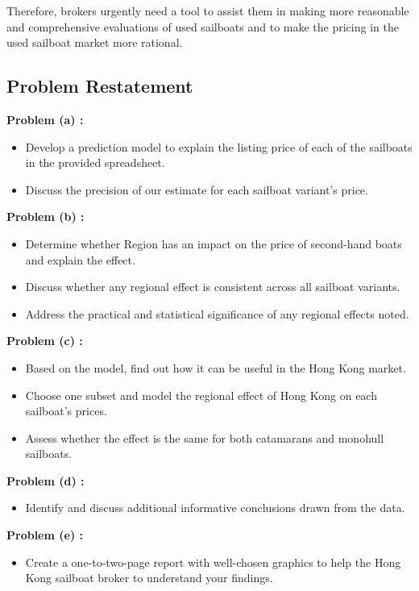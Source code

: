 \documentclass[12pt]{article}  %
\begin{document}
Therefore, brokers urgently need a tool to assist them in making more reasonable and comprehensive evaluations of used sailboats and to make the pricing in the used sailboat market more rational.
\subsection{Problem Restatement}
\textbf{Problem (a) :}
\begin{itemize}
    \item Develop a prediction model to explain the listing price of each of the sailboats in the provided spreadsheet.
    \item Discuss the precision of our estimate for each sailboat variant's price.
\end{itemize}

\textbf{Problem (b) :}
\begin{itemize}
    \item Determine whether Region has an impact on the price of second-hand boats and explain the effect.
    \item Discuss whether any regional effect is consistent across all sailboat variants.
    \item Address the practical and statistical significance of any regional effects noted.
\end{itemize}

\textbf{Problem (c) :}
\begin{itemize}
    \item Based on the model, find out how it can be useful in the Hong Kong market.
    \item Choose one subset and model the regional effect of Hong Kong on each sailboat's prices.
    \item Assess whether the effect is the same for both catamarans and monohull sailboats.
\end{itemize}

\textbf{Problem (d) :}
\begin{itemize}
    \item Identify and discuss additional informative conclusions drawn from the data.
\end{itemize}

\textbf{Problem (e) :}
\begin{itemize}
    \item Create a one-to-two-page report with well-chosen graphics to help the Hong Kong sailboat broker to understand your findings.
\end{itemize}
\end{document}
